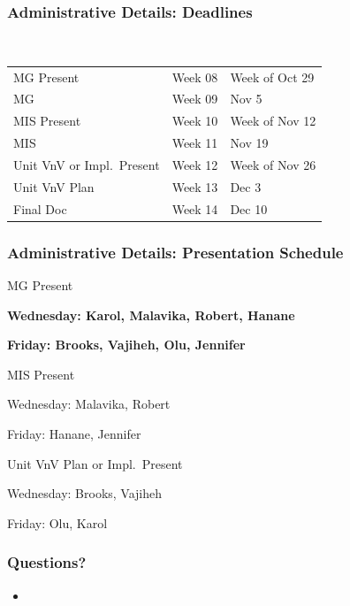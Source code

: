 \documentclass[t,12pt,numbers,fleqn]{beamer}
\begin{document}
\begin{frame}
\frametitle{Administrative Details: Deadlines}

~\newline
\begin{tabular}{l l l}
MG Present & Week 08 & Week of Oct 29\\
MG & Week 09 & Nov 5\\
MIS Present & Week 10 & Week of Nov 12\\
MIS & Week 11 & Nov 19\\
Unit VnV or Impl.\ Present & Week 12 & Week of Nov 26\\
Unit VnV Plan & Week 13 & Dec 3\\
Final Doc & Week 14 & Dec 10\\
\end {tabular}

\end{frame}


\begin{frame}
\frametitle{Administrative Details: Presentation Schedule}

\bi
\item MG Present
\bi
\item \textbf{Wednesday: Karol, Malavika, Robert, Hanane}
\item \textbf{Friday: Brooks, Vajiheh, Olu, Jennifer}
\ei
\item MIS Present
\bi
\item Wednesday: Malavika, Robert
\item Friday: Hanane,  Jennifer
\ei
\item Unit VnV Plan or Impl.\ Present
\bi
\item Wednesday: Brooks, Vajiheh
\item Friday: Olu, Karol
\ei
\ei

\end{frame}


\begin{frame}
\frametitle{Questions?}
\begin{itemize}
\item {}
\end{itemize}
\end{frame}

\end{document}
